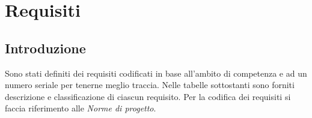 


\newcommand{\RFM}{
    \stepcounter{M}
    \stepcounter{RF}
    \stepcounter{RF1}
    RF\arabic{RF}
}
\newcommand{\RFD}{
    \stepcounter{D}
    \stepcounter{RF}
    \stepcounter{RF2}
    RF\arabic{RF}
}
\newcommand{\RFO}{
    \stepcounter{O}
    \stepcounter{RF}
    \stepcounter{RF3}
    RF\arabic{RF}
}
\newcommand{\RVM}{
    \stepcounter{M}
    \stepcounter{RV}
    \stepcounter{RV1}
    RV\arabic{RV}
}
\newcommand{\RVD}{
    \stepcounter{D}
    \stepcounter{RV}
    \stepcounter{RV2}
    RV\arabic{RV}
}
\newcommand{\RVO}{
    \stepcounter{O}
    \stepcounter{RV}
    \stepcounter{RV3}
    RV\arabic{RV}
}
\newcommand{\RPM}{
    \stepcounter{M}
    \stepcounter{RP}
    \stepcounter{RP1}
    RP\arabic{RP}
}
\newcommand{\RPD}{
    \stepcounter{D}
    \stepcounter{RP}
    \stepcounter{RP2}
    RP\arabic{RP}
}
\newcommand{\RPO}{
    \stepcounter{O}
    \stepcounter{RP}
    \stepcounter{RP3}
    RP\arabic{RP}
}
\newcommand{\RQM}{
    \stepcounter{M}
    \stepcounter{RQ}
    \stepcounter{RQ1}
    RQ\arabic{RQ}
}
\newcommand{\RQD}{
    \stepcounter{D}
    \stepcounter{RQ}
    \stepcounter{RQ2}
    RQ\arabic{RQ}
}
\newcommand{\RQO}{
    \stepcounter{O}
    \stepcounter{RQ}
    \stepcounter{RQ3}
    RQ\arabic{RQ}
}



\section{Requisiti}
\subsection{Introduzione}
Sono stati definiti dei requisiti codificati in base all’ambito di competenza e ad un numero seriale per
tenerne meglio traccia. Nelle tabelle sottostanti sono forniti descrizione e classificazione di ciascun
requisito. 
Per la codifica dei requisiti si faccia riferimento alle \textit{Norme di progetto}.
